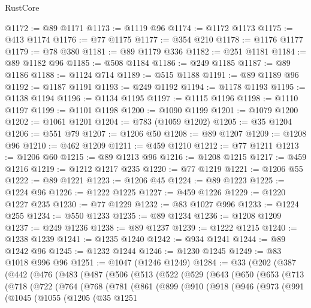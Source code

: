 \begin{lexlean}{RustCore}
\begin{coremodule}
@1172 := @89 @1171
@1173 := @1119 @96
@1174 := @1172 @1173
@1175 := @413 @1174
@1176 := @77 @1175
@1177 := @354 @210
@1178 := @1176 @1177
@1179 := @78 @380
@1181 := @89 @1179 @336
@1182 := @251 @1181
@1184 := @89 @1182 @96
@1185 := @508 @1184
@1186 := @249 @1185
@1187 := @89 @1186
@1188 := @1124 @714
@1189 := @515 @1188
@1191 := @89 @1189 @96
@1192 := @1187 @1191
@1193 := @249 @1192
@1194 := @1178 @1193
@1195 := @1138 @1194
@1196 := @1134 @1195
@1197 := @1115 @1196
@1198 := @1110 @1197
@1199 := @1101 @1198
@1200 := @1090 @1199
@1201 := @1079 @1200
@1202 := @1061 @1201
@1204 := @783 (@1059 @1202)
@1205 := @35 @1204
@1206 := @551 @79
@1207 := @1206 @50
@1208 := @89 @1207
@1209 := @1208 @96
@1210 := @462 @1209
@1211 := @459 @1210
@1212 := @77 @1211
@1213 := @1206 @60
@1215 := @89 @1213 @96
@1216 := @1208 @1215
@1217 := @459 @1216
@1219 := @1212 @1217 @235
@1220 := @77 @1219
@1221 := @1206 @55
@1222 := @89 @1221
@1223 := @1206 @45
@1224 := @89 @1223
@1225 := @1224 @96
@1226 := @1222 @1225
@1227 := @459 @1226
@1229 := @1220 @1227 @235
@1230 := @77 @1229
@1232 := @83 @1027 @996
@1233 := @1224 @255
@1234 := @550 @1233
@1235 := @89 @1234
@1236 := @1208 @1209
@1237 := @249 @1236
@1238 := @89 @1237
@1239 := @1222 @1215
@1240 := @1238 @1239
@1241 := @1235 @1240
@1242 := @934 @1241
@1244 := @89 @1242 @96
@1245 := @1232 @1244
@1246 := @1230 @1245
@1249 := @83 @1018 @996 @96
@1251 := @1047 (@1246 @1249)
@1284 := @33
    (@202
      (@387
        (@442
          (@476
            (@483
              (@487
                (@506
                  (@513
                    (@522
                      (@529
                        (@643
                          (@650
                            (@653
                              (@713
                                (@718
                                  (@722
                                    (@764
                                      (@768
                                        (@781
                                          (@861
                                            (@899
                                              (@910
                                                (@918
                                                  (@946
                                                    (@973
                                                      (@991
                                                        (@1045
                                                          (@1055
                                                            (@1205
                                                              (@35
                                                                @1251

\end{coremodule}
\end{lexlean}
